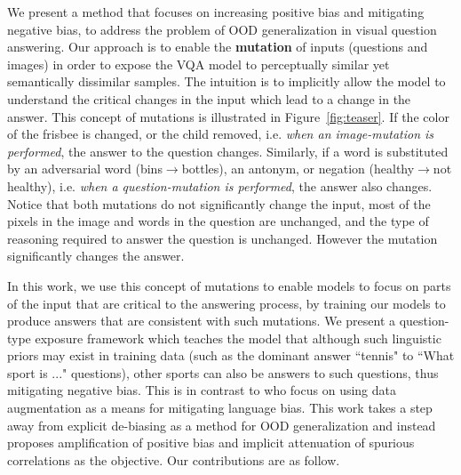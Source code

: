 We present a method that focuses on increasing positive bias and mitigating negative bias, to address the problem of OOD generalization in visual question answering.
Our approach is to enable the \textbf{mutation} of inputs (questions and images) in order to expose the VQA model to perceptually similar yet semantically dissimilar samples. 
The intuition 
is to implicitly allow the model to understand the critical changes in the input which lead to a change in the answer.
This concept of mutations is illustrated in Figure~\ref{fig:teaser}.
If the color of the frisbee is changed, or the child removed, i.e. \textit{when an image-mutation is performed}, the answer to the question changes.
Similarly, if a word is substituted by an adversarial word (bins$\rightarrow$bottles), an antonym, or negation (healthy$\rightarrow$not healthy), i.e. \textit{when a question-mutation is performed}, the answer also changes.
Notice that both mutations do not significantly change the input, most of the pixels in the image and words in the question are unchanged, and the type of reasoning required to answer the question is unchanged.
However the mutation significantly changes the answer.

In this work, we use this concept of mutations to enable models to focus on parts of the input that are critical to the answering process, by training our models to produce answers that are consistent with such mutations.
We present a question-type exposure framework which teaches the model that although such linguistic priors may exist in training data
(such as the dominant answer ``tennis" to ``What sport is ..." questions),
other sports can also be answers to such questions, thus mitigating negative bias.
This is in contrast to \citet{chen2020counterfactual} who focus on using data augmentation as a means for mitigating language bias.
This work takes a step away from explicit de-biasing as a method for OOD generalization and instead proposes amplification of positive bias and implicit attenuation of spurious correlations as the objective. Our contributions are as follow.

